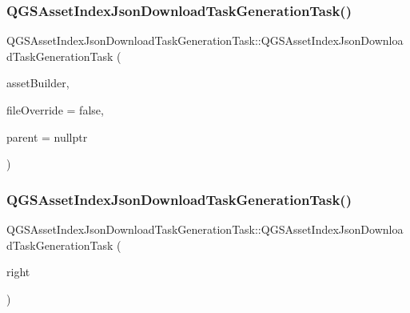 \subsubsection{\texorpdfstring{Q\+G\+S\+Asset\+Index\+Json\+Download\+Task\+Generation\+Task()}{QGSAssetIndexJsonDownloadTaskGenerationTask()}\hspace{0.1cm}{\footnotesize\ttfamily [1/3]}}
{\footnotesize\ttfamily Q\+G\+S\+Asset\+Index\+Json\+Download\+Task\+Generation\+Task\+::\+Q\+G\+S\+Asset\+Index\+Json\+Download\+Task\+Generation\+Task (\begin{DoxyParamCaption}\item[{\mbox{\hyperlink{class_q_g_s_asset_builder}{Q\+G\+S\+Asset\+Builder}} $\ast$}]{asset\+Builder,  }\item[{bool}]{file\+Override = {\ttfamily false},  }\item[{Q\+Object $\ast$}]{parent = {\ttfamily nullptr} }\end{DoxyParamCaption})}

\mbox{\label{class_q_g_s_asset_index_json_download_task_generation_task_a4c22d57feb3ff06f5b81274484de06b7}} 
\subsubsection{\texorpdfstring{Q\+G\+S\+Asset\+Index\+Json\+Download\+Task\+Generation\+Task()}{QGSAssetIndexJsonDownloadTaskGenerationTask()}\hspace{0.1cm}{\footnotesize\ttfamily [2/3]}}
{\footnotesize\ttfamily Q\+G\+S\+Asset\+Index\+Json\+Download\+Task\+Generation\+Task\+::\+Q\+G\+S\+Asset\+Index\+Json\+Download\+Task\+Generation\+Task (\begin{DoxyParamCaption}\item[{const \mbox{\hyperlink{class_q_g_s_asset_index_json_download_task_generation_task}{Q\+G\+S\+Asset\+Index\+Json\+Download\+Task\+Generation\+Task}} \&}]{right }\end{DoxyParamCaption})\hspace{0.3cm}{\ttfamily [delete]}}

